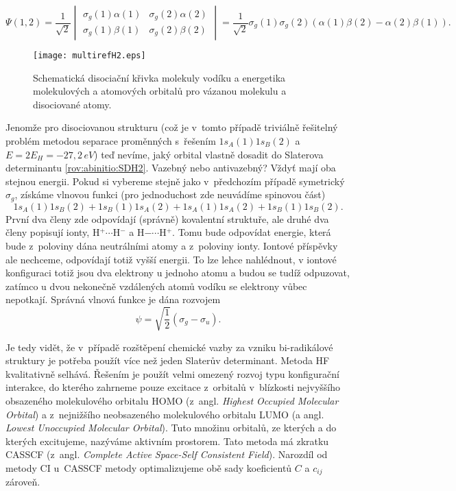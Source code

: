 \begin{equation}
\Psi (1,2)=\frac{1}{\sqrt{2}}
\begin{vmatrix}
\sigma_g(1)\alpha (1) & \sigma_g(2)\alpha (2) \\
\sigma_g(1)\beta (1) & \sigma_g(2)\beta (2)
\end{vmatrix}
=\frac{1}{\sqrt{2}}\sigma_g(1)\sigma_g(2)(\alpha (1)\beta (2)-\alpha (2)\beta (1)) .
\label{rov:abinitio:SDH2}
\end{equation}

\begin{figure} [htb]
\centering
\texttt{[image: multirefH2.eps]}
\caption[Disociace molekuly vodíku]{Schematická disociační křivka molekuly vodíku a energetika molekulových a atomových orbitalů pro vázanou molekulu a disociované atomy.}
\label{obr:abinitio:multirefH2}
\end{figure}

Jenomže pro disociovanou strukturu (což je v~tomto  případě triviálně řešitelný problém metodou separace proměnných s~řešením $1s_A(1)1s_B(2)$ a $E=2E_H=-27,2\,eV$) teď nevíme, jaký orbital vlastně dosadit do Slaterova determinantu \ref{rov:abinitio:SDH2}. Vazebný nebo antivazebný? Vždyť mají oba stejnou energii. Pokud si vybereme stejně jako v~předchozím případě symetrický $\sigma_g$, získáme vlnovou funkci (pro jednoduchost zde neuvádíme spinovou část)
\begin{equation}
1s_A(1)1s_B(2)+1s_B(1)1s_A(2)+1s_A(1)1s_A(2)+ 1s_B(1)1s_B(2) .
\end{equation}
První dva členy zde odpovídají (správně) kovalentní struktuře, ale druhé dva členy popisují ionty, H$^+\cdots$H$^-$ a H$-\cdots$H$^+$. Tomu bude odpovídat energie, která bude z~poloviny dána neutrálními atomy a z~poloviny ionty. Iontové příspěvky ale nechceme, odpovídají totiž vyšší energii.
To lze lehce nahlédnout, v iontové konfiguraci totiž jsou dva elektrony u jednoho atomu a budou se tudíž odpuzovat, zatímco u dvou nekonečně vzdálených atomů vodíku se elektrony vůbec nepotkají.
Správná vlnová funkce je dána rozvojem
\begin{equation}
\psi= \sqrt{\frac{1}{2}} (\sigma_g-\sigma_u).
\end{equation}

Je tedy vidět, že v~případě rozštěpení chemické vazby za vzniku bi-radikálové struktury je potřeba použít více než jeden Slaterův determinant. Metoda HF kvalitativně selhává. Řešením je použít velmi omezený rozvoj typu konfigurační interakce, do kterého zahrneme pouze excitace z~orbitalů v~blízkosti nejvyššího obsazeného molekulového orbitalu HOMO (z~angl. \textit{Highest Occupied Molecular Orbital}) a z~nejnižšího neobsazeného molekulového orbitalu LUMO (a angl. \textit{Lowest Unoccupied Molecular Orbital}). Tuto množinu orbitalů, ze kterých a do kterých excitujeme, nazýváme aktivním prostorem. Tato metoda má zkratku CASSCF (z~angl. \textit{Complete Active Space-Self Consistent Field}). Narozdíl od metody CI u~CASSCF metody optimalizujeme obě sady koeficientů $C$ a $c_{ij}$ zároveň. 

